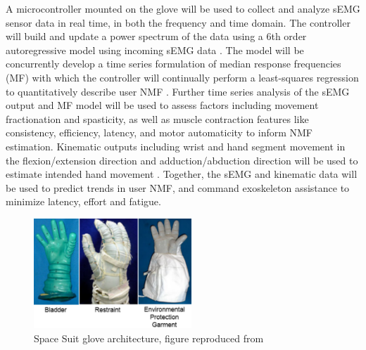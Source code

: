 \documentclass{article}
\begin{document}
A microcontroller mounted on the glove will be used to collect and analyze sEMG sensor data in real time, in both the frequency and time domain. The controller will build and update a power spectrum of the data using a 6th order autoregressive model using incoming sEMG data \cite{Madden2017TheIO}. The model will be concurrently develop a time series formulation of median response frequencies (MF) with which the controller will continually perform a least-squares regression to quantitatively describe user NMF \cite{Madden2017TheIO}. Further time series analysis of the sEMG output and MF model will be used to assess factors including movement fractionation and spasticity, as well as muscle contraction features like consistency, efficiency, latency, and motor automaticity \cite{Celik2010NormalizedMQ, Min2018ElectromyogramRU} to inform NMF estimation. Kinematic outputs including wrist and hand segment movement in the flexion/extension direction and adduction/abduction direction will be used to estimate intended hand movement \cite{Safavynia2011MuscleSI,Rose2019HybridRH}. Together, the sEMG and kinematic data will be used to predict trends in user NMF, and command exoskeleton assistance to minimize latency, effort and fatigue.

\begin{figure}
  \begin{center}
    \includegraphics[width=0.5275\textwidth]{figures/space suit glove design 2.pdf}
  \end{center}
  \caption{Space Suit glove architecture, figure reproduced from \cite{Rogers2017DevelopmentAT}}
  \label{SpaceSuitLayers}
\end{figure}
\end{document}
